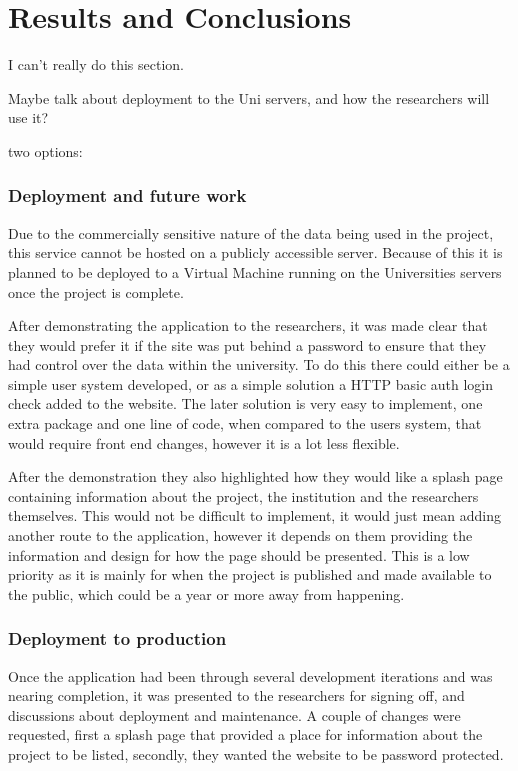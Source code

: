 \chapter{Results and Conclusions}
I can't really do this section.

Maybe talk about deployment to the Uni servers, and how the researchers will use it? 

two options:

\subsection{Deployment and future work}
Due to the commercially sensitive nature of the data being used in the project, this service cannot be hosted on a publicly accessible server. Because of this it is planned to be deployed to a Virtual Machine running on the Universities servers once the project is complete. 

After demonstrating the application to the researchers, it was made clear that they would prefer it if the site was put behind a password to ensure that they had control over the data within the university. To do this there could either be a simple user system developed, or as a simple solution a HTTP basic auth login check added to the website. The later solution is very easy to implement, one extra package and one line of code, when compared to the users system, that would require front end changes, however it is a lot less flexible. 

After the demonstration they also highlighted how they would like a splash page containing information about the project, the institution and the researchers themselves. This would not be difficult to implement, it would just mean adding another route to the application, however it depends on them providing the information and design for how the page should be presented. This is a low priority as it is mainly for when the project is published and made available to the public, which could be a year or more away from happening. 

\subsection{Deployment to production}
Once the application had been through several development iterations and was nearing completion, it was presented to the researchers for signing off, and discussions about deployment and maintenance. A couple of changes were requested, first a splash page that provided a place for information about the project to be listed, secondly, they wanted the website to be password protected. 

